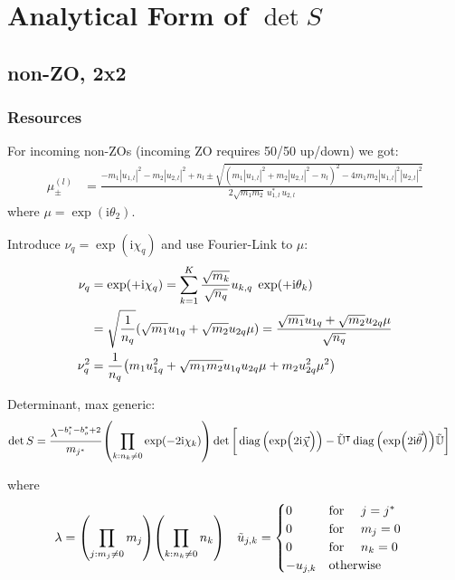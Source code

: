 \documentclass[
	english,
	a4paper,
	fontsize=10pt,
	parskip=half,
	titlepage=true,
	DIV=12,
	final
]{scrreprt}
\title{\myTitle}
\author{\myName}
\date{\today}
\newcommand*{\transp}{\ensuremath{^\intercal}}
\newcommand*{\iunit}{\ensuremath{\mathrm{i}}}
\DeclareMathOperator{\diag}{diag}
\begin{document}
\tableofcontents
\newpage

\chapter{Analytical Form of $\det S$}
\section{non-ZO, 2x2}
\subsection{Resources}
For incoming non-ZOs (incoming ZO requires 50/50 up/down) we got:
\begin{align}
	\mu_{\pm}^{(l)}
&=
	\frac
	{
		- m_1 |u_{1,l}|^{2}  -  m_2 |u_{2,l}|^{2} + n_l
		\pm
		\sqrt{
			(m_1 |u_{1,l}|^{2}  +  m_2 |u_{2,l}|^{2} - n_l)^{2}
			-
			4 m_1 m_2 |u_{1,l}|^{2} |u_{2,l}|^{2}
		}
	}
	{ 2\sqrt{m_1 m_2} \, u_{1,l}^{*} \, u_{2,l} }
\end{align}
where $\mu = \exp(\iunit \theta_2)$.

Introduce $\nu_q = \exp(\iunit \chi_q)$ and use Fourier-Link to $\mu$:
\begin{align}
	\nu_q
&=
	\exp(+\iunit \chi_q)
=
	\sum_{k=1}^{K}
		\frac{\sqrt{m_k}}{\sqrt{n_q}}
		u_{k,q} \; \exp(+\iunit\theta_k) \\
&=
	\sqrt{\frac{1}{n_q}} \qty(
		  \sqrt{m_1} u_{1q}
		+ \sqrt{m_2} u_{2q} \mu
	)
=
	\frac{
	    \sqrt{m_1} u_{1q}
		+ \sqrt{m_2} u_{2q} \mu}
		{\sqrt{n_q}}
\\
	\nu_q^2
&=
	\frac{1}{n_q} \qty(
		  m_1 u_{1q}^2
		+ \sqrt{m_1 m_2} u_{1q} u_{2q} \mu
		+ m_2 u_{2q}^2 \mu^2
	)
\label{eqn:nuSquaredExpansion}
\end{align}

Determinant, max generic:
\begin{align}
	\det S
&=
	\frac{ \lambda^{-b_i^* - b_o^* + 2} }{ m_{j^*} }
	\qty( \prod_{k: n_k \neq 0} \exp(-2\iunit \chi_k) )
	\det\qty[\bigg.
		\diag\qty(\exp(\Big.2\iunit\vec{\chi}))
		-
		\tilde{\mathbb{U}}\transp
		\diag\qty(\exp(2\iunit\vec{\theta}))
		\tilde{\mathbb{U}}
	]
\end{align}

where
\begin{align}
	\lambda
&=
	\qty( \prod_{j : m_j \neq 0} m_j )
	\qty( \prod_{k : n_k \neq 0} n_k )
&
	\tilde{u}_{j,k} 
&=
	\begin{cases}
		0			&\qq*{for } j = j^* \\
		0			&\qq*{for } m_j = 0 \\
		0			&\qq*{for } n_k = 0 \\
		-u_{j,k}		&\qotherwise*
	\end{cases}
\end{align}
\end{document}
